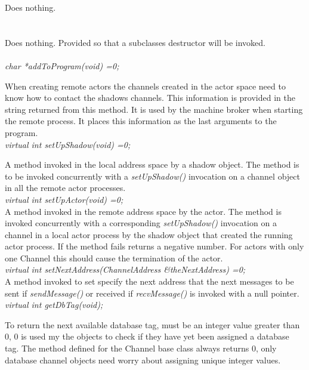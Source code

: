 Does nothing. \\

 \\
\\ 
Does nothing. Provided so that a subclasses destructor will be invoked. \\

  \\
{\em char *addToProgram(void) =0;} 

When creating remote actors the channels created in the actor space
need to know how to contact the shadows channels. This information is
provided in the string returned from this method. It is used by the
machine broker when starting the remote process. It places this
information as the last arguments to the program. \\

{\em virtual int setUpShadow(void) =0;} 

A method invoked in the local address space by a shadow object. The
method is to be invoked concurrently with a {\em setUpShadow()}
invocation on a channel object in all the remote actor processes.\\

{\em virtual int setUpActor(void) =0;} \\
A method invoked in the remote address space by the actor. The method
is invoked concurrently with a corresponding {\em setUpShadow()}
invocation on a channel in a local actor process by the shadow object
that created the running actor process. If the method fails returns a
negative number. For actors with only one Channel this should cause
the termination of the actor. \\

{\em virtual int setNextAddress(ChannelAddress \&theNextAddress) =0;}\\
A method invoked to set specify the next address that the next
messages to be sent if {\em sendMessage()} or received if {\em
recvMessage()} is invoked with a null pointer. \\

{\em virtual int getDbTag(void);} 

To return the next available database tag, must be an integer value
greater than $0$, $0$ is used my the objects to check if they have yet
been assigned a database tag. The method defined for the Channel base
class always returns $0$, only database channel objects need worry
about assigning unique integer values. \\

